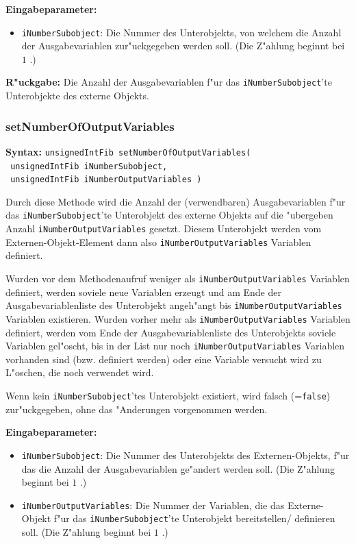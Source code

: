 \bigskip\noindent
\textbf{Eingabeparameter:}
\begin{itemize}
 \item \verb|iNumberSubobject|: Die Nummer des Unterobjekts, von welchem die Anzahl der Ausgabevariablen zur"uckgegeben werden soll. (Die Z"ahlung beginnt bei $1$ .)
\end{itemize}

\bigskip\noindent
\textbf{R"uckgabe:} Die Anzahl der Ausgabevariablen f"ur das \verb|iNumberSubobject|'te Unterobjekte des externe Objekts.


\subsubsection{setNumberOfOutputVariables}

\textbf{Syntax:} \verb|unsignedIntFib setNumberOfOutputVariables(| \\\verb| unsignedIntFib iNumberSubobject,| \\\verb| unsignedIntFib iNumberOutputVariables )|

\bigskip\noindent
Durch diese Methode wird die Anzahl der (verwendbaren) Ausgabevariablen f"ur das \verb|iNumberSubobject|'te Unterobjekt des externe Objekts auf die "ubergeben Anzahl \verb|iNumberOutputVariables| gesetzt. Diesem Unterobjekt werden vom Externen-Objekt-Element dann also \verb|iNumberOutputVariables| Variablen definiert.

Wurden vor dem Methodenaufruf weniger als \verb|iNumberOutputVariables| Variablen definiert, werden soviele neue Variablen erzeugt und am Ende der Ausgabevariablenliste des Unterobjekt angeh"angt bis \verb|iNumberOutputVariables| Variablen existieren. Wurden vorher mehr als \verb|iNumberOutputVariables| Variablen definiert, werden vom Ende der Ausgabevariablenliste des Unterobjekts soviele Variablen gel"oscht, bis in der List nur noch \verb|iNumberOutputVariables| Variablen vorhanden sind (bzw. definiert werden) oder eine Variable versucht wird zu L"oschen, die noch verwendet wird.

Wenn kein \verb|iNumberSubobject|'tes Unterobjekt existiert, wird falsch (=\verb|false|) zur"uckgegeben, ohne das "Anderungen vorgenommen werden.

\bigskip\noindent
\textbf{Eingabeparameter:}
\begin{itemize}
 \item \verb|iNumberSubobject|: Die Nummer des Unterobjekts des Externen-Objekts, f"ur das die Anzahl der Ausgabevariablen ge"andert werden soll. (Die Z"ahlung beginnt bei $1$ .)
 \item \verb|iNumberOutputVariables|: Die Nummer der Variablen, die das Externe-Objekt f"ur das \verb|iNumberSubobject|'te Unterobjekt bereitstellen/ definieren soll. (Die Z"ahlung beginnt bei $1$ .)
\end{itemize}

